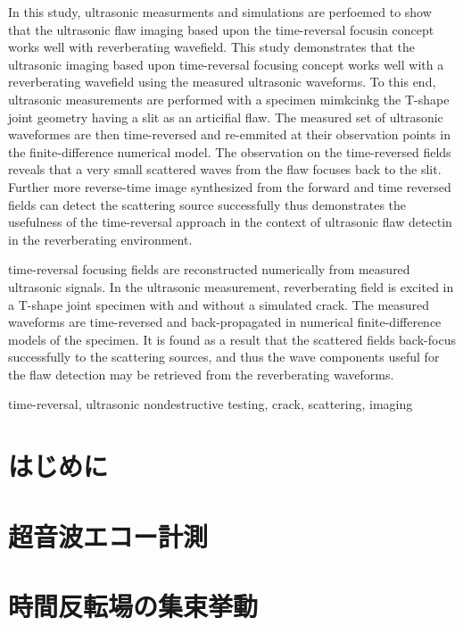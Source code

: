 \documentclass{jjsce}
\begin{document}
\begin{Eabstract}
In this study, ultrasonic measurments and simulations are perfoemed to show 
that the ultrasonic flaw imaging based upon the time-reversal focusin concept 
works well with reverberating wavefield.
 This study demonstrates that the ultrasonic imaging based upon time-reversal 
 focusing concept works well with a reverberating wavefield using the measured 
 ultrasonic waveforms. To this end, ultrasonic measurements are performed 
 with a specimen mimkcinkg the T-shape joint geometry having a slit as an articifial flaw. 
 The measured set of ultrasonic waveformes are then time-reversed and re-emmited at 
 their observation points in the finite-difference numerical model.
 The observation on the time-reversed fields reveals that a 
 very small scattered waves from the flaw focuses back to the slit. 
 Further more reverse-time image synthesized from the forward and 
 time reversed fields can detect the scattering source successfully thus 
 demonstrates the usefulness of the time-reversal approach in the context of 
 ultrasonic flaw detectin in the reverberating environment.

time-reversal focusing fields are reconstructed numerically from measured ultrasonic signals.
In the ultrasonic measurement, reverberating field is excited in a T-shape joint specimen with and without a simulated crack. 
The measured waveforms are time-reversed and back-propagated in numerical finite-difference models of the specimen.
It is found as a result that the scattered fields back-focus successfully to the scattering sources,
and thus the wave components useful for the flaw detection may be retrieved from the reverberating waveforms.
\end{Eabstract}
\begin{keyword}
time-reversal, ultrasonic nondestructive testing, crack, scattering, imaging
\end{keyword}
\maketitle
\section{はじめに}
	
\section{超音波エコー計測}
	
\section{時間反転場の集束挙動}
	
\end{document}
